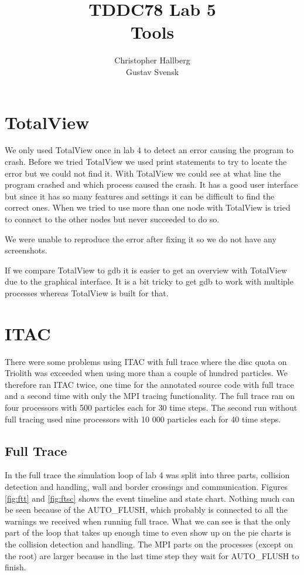 \documentclass[a4paper, 12pt]{article}
\begin{document}
\title{TDDC78 Lab 5\\
        Tools }
\author{Christopher Hallberg \\
        Gustav Svensk}
\maketitle

\thispagestyle{empty}

\newpage
\setcounter{page}{1}
\tableofcontents
\newpage

\section{TotalView}
We only used TotalView once in lab 4 to detect an error causing the program to
crash. Before we tried TotalView we used print statements to try to locate the
error but we could not find it. With TotalView we could see at what line the
program crashed and which process caused the crash. It has a good user interface
but since it has so many features and settings it can be difficult to find the
correct ones. When we tried to use more than one node with TotalView is tried to
connect to the other nodes but never succeeded to do so.

We were unable to reproduce the error after fixing it so we do not have any
screenshots.

If we compare TotalView to gdb it is easier to get an overview with TotalView
due to the graphical interface. It is a bit tricky to get gdb to work with
multiple processes whereas TotalView is built for that.

\section{ITAC}
There were some problems using ITAC with full trace where the disc quota on Triolith
was exceeded when using more than a couple of hundred particles. We therefore
ran ITAC twice, one time for the annotated source code with full trace and a
second time with only the MPI tracing functionality. The full trace ran on
four processors with 500 particles each for 30 time steps. The second run without
full tracing used nine processors with 10 000 particles each for 40 time steps.

\subsection{Full Trace}
In the full trace the simulation loop of lab 4 was split into three parts,
collision detection and handling, wall and border crossings and communication. 
Figures \ref{fig:ftt} and \ref{fig:ftsc} shows the event timeline and state
chart. Nothing much can be seen because of the AUTO\_FLUSH, which probably is
connected to all the warnings we received when running full trace. What we can
see is that the only part of the loop that takes up enough time to even show up
on the pie charts is the collision detection and handling. The MPI parts on the
processes (except on the root) are larger because in the last time step they wait for
AUTO\_FLUSH to finish. 
\end{document}
